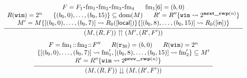 \begin{figure}[!t]
    \centering
    \[
		\begin{array}{c}
			\infer
			{
				\winOverFlow{(\mem, (\RFile, \Wstack))}{(\mem', (\RFile', \Wstack'))}
			}
			{
                \begin{array}{c}
                    \Wstack = \Wstack_1 \lstApp \fm_1 \lstApp \fm_2 \lstApp 
                        \fm_3 \lstApp \fm_4 \quad  \ \ \fm_1[6] = (\block, 0) \\
                    \RFile(\regwim) = 2^n \quad \ \ 
                    \{ (\block_0, 0), \dots, (\block_0, 15) \} \subseteq \dom(\mem) \quad \ \ 
                    \RFile' = \RFile''\{ \regwim \rightsquigarrow 2^{\nextcwp{(n)}} \} \\
                    \mem' = \mem\{ \Array{(\block_0, 0), \dots, (\block_0, 7)} \rightsquigarrow 
						\RFile_0([\localRN]) \}
						\{ \Array{(\block_0, 8), \dots, (\block_0, 15)} \rightsquigarrow 
							\RFile_0([\inRN]) \}
				\end{array}
			} \\
			\\[-5pt]
			\infer
			{
				\winUnderFlow{(\mem, (\RFile, \Wstack))}{(\mem, (\RFile', \Wstack'))}
			}
			{
                \begin{array}{c}
                    \Wstack = \fm_1 \stCons \fm_2 \stCons \Wstack'' \quad \ \ 
                    \RFile(\reg{30}) = (\block, 0) \quad \ \ \RFile(\regwim) = 2^n \\ 
                    \{
						\Array{(\block_0, 0), \dots, (\block_0, 7)} \rightsquigarrow \fm_1', 
						\Array{(\block_0, 8), \dots, (\block_0, 15)} \rightsquigarrow \fm_2'
                    \} \subseteq \mem' \\
                    \RFile' = \RFile''\{\regwim \rightsquigarrow 2^{\prevcwp{(n)}}\} \quad \ \ 

\end{array}}
\end{array}\]
\end{figure}
